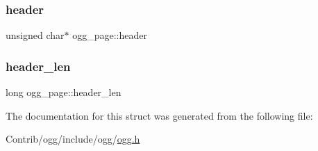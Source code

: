 \mbox{\label{structogg__page_a9f251dc1a96fbfd84ff2585fbbc03c16}} 
\subsubsection{\texorpdfstring{header}{header}}
{\footnotesize\ttfamily unsigned char$\ast$ ogg\+\_\+page\+::header}

\mbox{\label{structogg__page_aeaa6edc2ff9f2c5cc8f0ecf001936b7b}} 
\subsubsection{\texorpdfstring{header\+\_\+len}{header\_len}}
{\footnotesize\ttfamily long ogg\+\_\+page\+::header\+\_\+len}



The documentation for this struct was generated from the following file\+:\begin{DoxyCompactItemize}
\item 
Contrib/ogg/include/ogg/\mbox{\hyperlink{ogg_8h}{ogg.\+h}}\end{DoxyCompactItemize}
